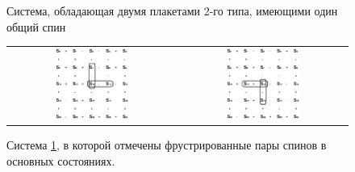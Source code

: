 \documentclass[utf8, babel, sor, jor, amsmath, amssymb, reprint]{elsarticle} %
\begin{document}
\begin{figure}[H]
	\centering
	\caption{Система, обладающая двумя плакетами 2-го типа, имеющими один общий спин}
	\label{fig:5x5.2F}
\end{figure}

\begin{figure}[htbp]
	\centering
	\begin{tabular}{cc}
		\includegraphics[width=0.45\textwidth]{Cl5x5_Type2_gs1.eps} & \hspace{0.05\textwidth}
		\includegraphics[width=0.45\textwidth]{Cl5x5_Type2_gs2.eps} 
	\end{tabular}
	\caption{Система \ref{fig:5x5.2F}, в которой отмечены фрустрированные пары спинов в основных состояниях.}
\label{fig:5x5.22F}
\end{figure}
\end{document}
